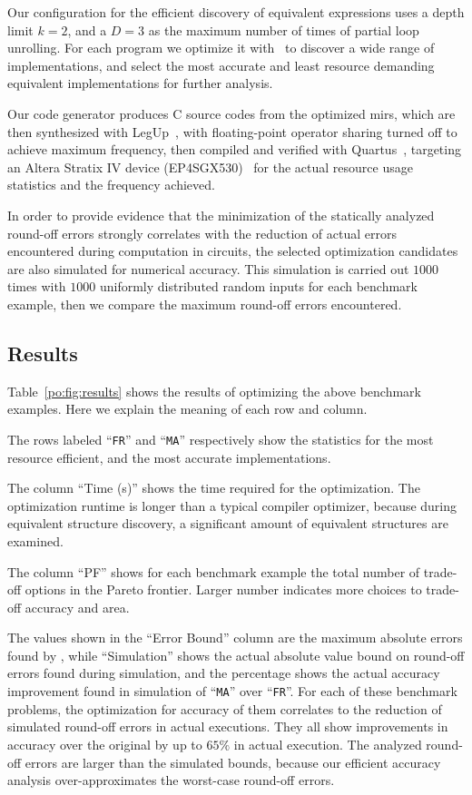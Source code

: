 Our configuration for the efficient discovery of equivalent expressions uses a
depth limit $k = 2$, and a $D = 3$ as the maximum number of times of partial
loop unrolling.  For each program we optimize it with \soap~to discover a wide
range of implementations, and select the most accurate and least resource
demanding equivalent implementations for further analysis.

Our code generator produces C source codes from the
optimized \glspl{mir}, which are then synthesized with LegUp~\cite{legup}, with
floating-point operator sharing turned off to achieve maximum frequency, then
compiled and verified with Quartus~\cite{quartus}, targeting an Altera Stratix
IV device (\textrm{EP4SGX530})~\cite{stratix4} for the actual resource usage
statistics and the frequency achieved.

In order to provide evidence that the minimization of the statically analyzed
round-off errors strongly correlates with the reduction of actual errors
encountered during computation in circuits, the selected optimization
candidates are also simulated for numerical accuracy.  This simulation is
carried out $1000$ times with $1000$ uniformly distributed random inputs
for each benchmark example, then we compare the maximum round-off errors
encountered.


\subsection{Results}

Table~\ref{po:fig:results} shows the results of optimizing the above benchmark
examples.  Here we explain the meaning of each row and column.

The rows labeled ``\texttt{FR}'' and ``\texttt{MA}'' respectively show
the statistics for the most resource efficient, and the most accurate
implementations.

The column ``Time (s)'' shows the time required for the optimization.  The
optimization runtime is longer than a typical compiler optimizer, because
during equivalent structure discovery, a significant amount of equivalent
structures are examined.

The column ``PF'' shows for each benchmark example the total number of
trade-off options in the Pareto frontier.  Larger number indicates more choices
to trade-off accuracy and area.

The values shown in the ``Error Bound'' column are the maximum absolute
errors found by \soap, while ``Simulation'' shows the actual absolute value
bound on round-off errors found during simulation, and the percentage shows
the actual accuracy improvement found in simulation of ``\texttt{MA}'' over
``\texttt{FR}''.  For each of these benchmark problems, the optimization for
accuracy of them correlates to the reduction of simulated round-off errors in
actual executions.  They all show improvements in accuracy over the original
by up to $65\%$ in actual execution.  The analyzed round-off errors are
larger than the simulated bounds, because our efficient accuracy analysis
over-approximates the worst-case round-off errors.

